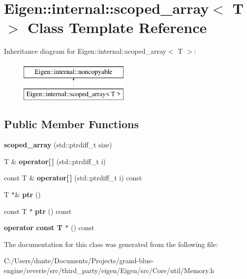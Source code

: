 \hypertarget{class_eigen_1_1internal_1_1scoped__array}{}\section{Eigen\+::internal\+::scoped\+\_\+array$<$ T $>$ Class Template Reference}
\label{class_eigen_1_1internal_1_1scoped__array}
Inheritance diagram for Eigen\+::internal\+::scoped\+\_\+array$<$ T $>$\+:\begin{figure}[H]
\begin{center}
\leavevmode
\includegraphics[height=2.000000cm]{class_eigen_1_1internal_1_1scoped__array}
\end{center}
\end{figure}
\subsection*{Public Member Functions}
\begin{DoxyCompactItemize}
\item 
\mbox{\label{class_eigen_1_1internal_1_1scoped__array_a9f8920e0264b84f4371ebeac7db8d85b}} 
{\bfseries scoped\+\_\+array} (std\+::ptrdiff\+\_\+t size)
\item 
\mbox{\label{class_eigen_1_1internal_1_1scoped__array_ada65cb975813d98f2450d3bc257821da}} 
T \& {\bfseries operator\mbox{[}$\,$\mbox{]}} (std\+::ptrdiff\+\_\+t i)
\item 
\mbox{\label{class_eigen_1_1internal_1_1scoped__array_aab88c47f00a9b3522fe60793d18f1e17}} 
const T \& {\bfseries operator\mbox{[}$\,$\mbox{]}} (std\+::ptrdiff\+\_\+t i) const
\item 
\mbox{\label{class_eigen_1_1internal_1_1scoped__array_a53e524d42e288b9117a59f5aded705dd}} 
T $\ast$\& {\bfseries ptr} ()
\item 
\mbox{\label{class_eigen_1_1internal_1_1scoped__array_a612b4dec5cb49f476918c94ef4901623}} 
const T $\ast$ {\bfseries ptr} () const
\item 
\mbox{\label{class_eigen_1_1internal_1_1scoped__array_a0806589a4a7087c0ee02f6e748675e00}} 
{\bfseries operator const T $\ast$} () const
\end{DoxyCompactItemize}


The documentation for this class was generated from the following file\+:\begin{DoxyCompactItemize}
\item 
C\+:/\+Users/dante/\+Documents/\+Projects/grand-\/blue-\/engine/reverie/src/third\+\_\+party/eigen/\+Eigen/src/\+Core/util/Memory.\+h\end{DoxyCompactItemize}
